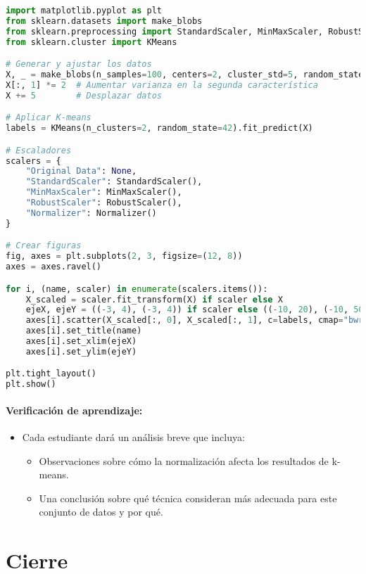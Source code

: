 \documentclass[a4,11pt]{aleph-notas}
\begin{document}
\begin{pycodigo}
\begin{lstlisting}[language=Python]
import matplotlib.pyplot as plt
from sklearn.datasets import make_blobs
from sklearn.preprocessing import StandardScaler, MinMaxScaler, RobustScaler, Normalizer
from sklearn.cluster import KMeans

# Generar y ajustar los datos
X, _ = make_blobs(n_samples=100, centers=2, cluster_std=5, random_state=42)
X[:, 1] *= 2  # Aumentar varianza en la segunda característica
X += 5        # Desplazar datos

# Aplicar K-means
labels = KMeans(n_clusters=2, random_state=42).fit_predict(X)

# Escaladores
scalers = {
    "Original Data": None,
    "StandardScaler": StandardScaler(),
    "MinMaxScaler": MinMaxScaler(),
    "RobustScaler": RobustScaler(),
    "Normalizer": Normalizer()
}

# Crear figuras
fig, axes = plt.subplots(2, 3, figsize=(12, 8))
axes = axes.ravel()

for i, (name, scaler) in enumerate(scalers.items()):
    X_scaled = scaler.fit_transform(X) if scaler else X
    ejeX, ejeY = ((-3, 4), (-3, 4)) if scaler else ((-10, 20), (-10, 50))
    axes[i].scatter(X_scaled[:, 0], X_scaled[:, 1], c=labels, cmap="bwr", alpha=0.6)
    axes[i].set_title(name)
    axes[i].set_xlim(ejeX)
    axes[i].set_ylim(ejeY)

plt.tight_layout()
plt.show()
\end{lstlisting}
\end{pycodigo}

\paragraph{Verificación de aprendizaje:}  
\begin{itemize}[leftmargin=*]
    \item Cada estudiante dará un análisis breve que incluya:
        \begin{itemize}
            \item Observaciones sobre cómo la normalización afecta los resultados de k-means.
            \item Una conclusión sobre qué técnica consideran más adecuada para este conjunto de datos y por qué.
        \end{itemize}
\end{itemize}



\section*{Cierre}
\end{document}

